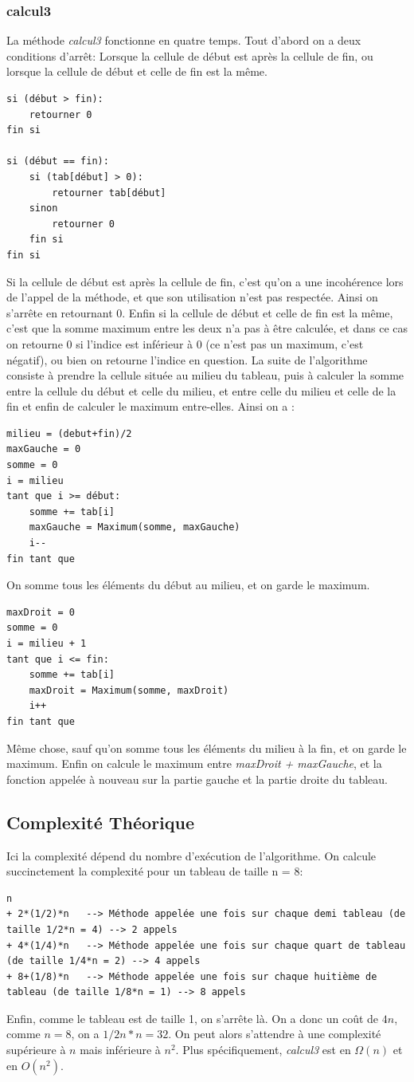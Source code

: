 \documentclass[a4paper, 12pt]{article}
\begin{document}
\subsubsection{calcul3}
La méthode \emph{calcul3} fonctionne en quatre temps. Tout d'abord on a deux conditions d'arrêt: Lorsque la cellule de début est après la cellule de fin, ou lorsque la cellule de début et celle de fin est la même.
\begin{verbatim}
si (début > fin):
    retourner 0
fin si

si (début == fin):
    si (tab[début] > 0):
        retourner tab[début]
    sinon
        retourner 0
    fin si        
fin si   
\end{verbatim}
Si la cellule de début est après la cellule de fin, c'est qu'on a une incohérence lors de l'appel de la méthode, et que son utilisation n'est pas respectée. Ainsi on s'arrête en retournant 0. Enfin si la cellule de début et celle de fin est la même, c'est que la somme maximum entre les deux n'a pas à être calculée, et dans ce cas on retourne 0 si l'indice est inférieur à 0 (ce n'est pas un maximum, c'est négatif), ou bien on retourne l'indice en question.
La suite de l'algorithme consiste à prendre la cellule située au milieu du tableau, puis à calculer la somme entre la cellule du début et celle du milieu, et entre celle du milieu et celle de la fin et enfin de calculer le maximum entre-elles.
Ainsi on a :
\begin{verbatim}
milieu = (debut+fin)/2
maxGauche = 0
somme = 0
i = milieu
tant que i >= début:
    somme += tab[i]
    maxGauche = Maximum(somme, maxGauche)
    i--
fin tant que 
\end{verbatim}
On somme tous les éléments du début au milieu, et on garde le maximum.
\begin{verbatim}
maxDroit = 0
somme = 0
i = milieu + 1
tant que i <= fin:
    somme += tab[i]
    maxDroit = Maximum(somme, maxDroit)
    i++
fin tant que 
\end{verbatim}
Même chose, sauf qu'on somme tous les éléments du milieu à la fin, et on garde le maximum.
Enfin on calcule le maximum entre \emph{maxDroit + maxGauche}, et la fonction appelée à nouveau sur la partie gauche et la partie droite du tableau.
\subsection{Complexité Théorique}
Ici la complexité dépend du nombre d'exécution de l'algorithme. On calcule succinctement la complexité pour un tableau de taille n = 8:
\begin{verbatim}
n
+ 2*(1/2)*n   --> Méthode appelée une fois sur chaque demi tableau (de taille 1/2*n = 4) --> 2 appels
+ 4*(1/4)*n   --> Méthode appelée une fois sur chaque quart de tableau (de taille 1/4*n = 2) --> 4 appels
+ 8+(1/8)*n   --> Méthode appelée une fois sur chaque huitième de tableau (de taille 1/8*n = 1) --> 8 appels
\end{verbatim} 
Enfin, comme le tableau est de taille 1, on s'arrête là. 
On a donc un coût de $4n$, comme $n = 8$, on a $1/2n*n = 32$. On peut alors s'attendre à une complexité supérieure à $n$ mais inférieure à $n^2$. 
Plus spécifiquement, \emph{calcul3} est en $\Omega(n)$ et en $O(n^2)$.
\end{document}

